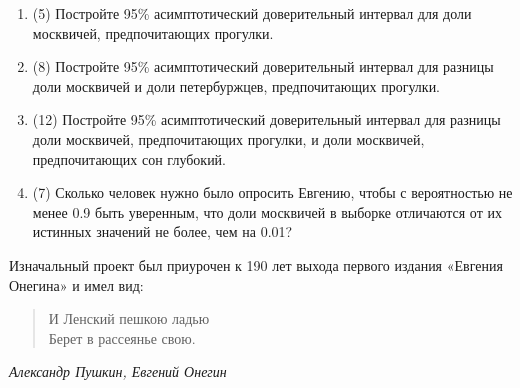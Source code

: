 \begin{enumerate}
  \begin{enumerate}
      \item (5) Постройте 95\% асимптотический доверительный интервал для доли москвичей, предпочитающих прогулки. 
      \item (8) Постройте 95\% асимптотический доверительный интервал для разницы  доли москвичей и доли петербуржцев, предпочитающих прогулки.
      \item (12) Постройте 95\% асимптотический доверительный интервал для разницы  доли москвичей, предпочитающих прогулки, и 
      доли москвичей, предпочитающих сон глубокий.
      \item (7) Сколько человек нужно было опросить Евгению, чтобы с вероятностью не менее 0.9 быть уверенным, что доли москвичей в выборке отличаются от их истинных значений не более, чем на 0.01? 
  \end{enumerate}
  
\end{enumerate}


Изначальный проект был приурочен к 190 лет выхода первого издания «Евгения Онегина» и имел вид:
\vspace*{0.5cm}

\begin{minipage}{0.6\textwidth}
  \begin{quote}
      И Ленский пешкою ладью \\
      Берет в рассеянье свою. 
  \end{quote}
  \begin{flushright}
      \textit{Александр Пушкин, Евгений Онегин}
  \end{flushright}
  \end{minipage}
  
